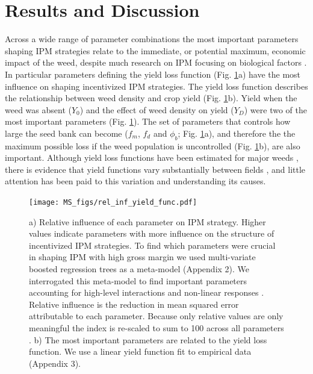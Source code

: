 \documentclass[12pt, a4paper]{article}
\begin{document}
\section*{Results and Discussion}
Across a wide range of parameter combinations the most important parameters shaping IPM strategies relate to the immediate, or potential maximum, economic impact of the weed, despite much research on IPM focusing on biological factors \citep{Colb2006}. In particular parameters defining the yield loss function (Fig. \ref{fig:rel_inf}a) have the most influence on shaping incentivized IPM strategies. The yield loss function describes the relationship between weed density and crop yield (Fig. \ref{fig:rel_inf}b). Yield when the weed was absent ($Y_0$) and the effect of weed density on yield ($Y_D$) were two of the most important parameters (Fig. \ref{fig:rel_inf}). The set of parameters that controls how large the seed bank can become  ($f_m$, $f_d$ and $\phi_b$; Fig. \ref{fig:rel_inf}a), and therefore the the maximum possible loss if the weed population is uncontrolled (Fig. \ref{fig:rel_inf}b), are also important. Although yield loss functions have been estimated for major weeds \citep{Cous1985, Doyl1986, Swin1994}, there is evidence that yield functions vary substantially between fields \citep{Swin1994, Hick2018}, and little attention has been paid to this variation and understanding its causes.
 \begin{figure}
	\centering
	\texttt{[image: MS\_figs/rel\_inf\_yield\_func.pdf]}
	\caption{a) Relative influence of each parameter on IPM strategy. Higher values indicate parameters with more influence on the structure of incentivized IPM strategies. To find which parameters were crucial in shaping IPM with high gross margin we used multi-variate boosted regression trees \citep{Mill2016} as a meta-model \citep{Cout2014}(Appendix 2). We interrogated this meta-model to find important parameters accounting for high-level interactions and non-linear responses \citep{Frie2001, Mill2016}. Relative influence is the reduction in mean squared error attributable to each parameter. Because only relative values are only meaningful the index is re-scaled to sum to 100 across all parameters \citep{Frie2001}. b) The most important parameters are related to the yield loss function. We use a linear yield function fit to empirical data (Appendix 3).}
	\label{fig:rel_inf} 
\end{figure}
\end{document}
